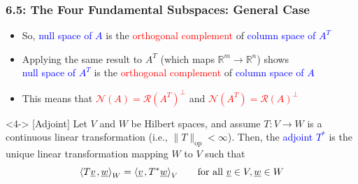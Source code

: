 \documentclass[10pt,english,aspectratio=169]{beamer}
\begin{document}
\begin{frame}
\frametitle{6.5: The Four Fundamental Subspaces: General Case}

\begin{itemize}
\setlength\itemsep{3mm}

\item<1-> So, \textcolor{blue}{null space of $A$} is the \textcolor{red}{orthogonal complement} of \textcolor{blue}{column space of $A^T$} 

\item<2-> Applying the same result to $A^T$ (which maps $\mathbb{R}^m \to \mathbb{R}^n$) shows \\[1.5mm] \hspace{2mm}
 \textcolor{blue}{null space of $A^T$} is the \textcolor{red}{orthogonal complement} of \textcolor{blue}{column space of $A$} 

\item<3-> This means that \textcolor{red}{$\mathcal{N}(A) = \mathcal{R}(A^T)^\perp$} and \textcolor{red}{$\mathcal{N}(A^T) = \mathcal{R}(A)^\perp$}
\end{itemize}

\begin{definition}<4-> [Adjoint]
Let $V$ and $W$ be Hilbert spaces, and assume $T \colon V \rightarrow W$ is a continuous linear transformation (i.e., $\| T \|_{\mathrm{op}} < \infty$).
Then, the \textcolor{blue}{adjoint $T^*$} is the unique linear transformation mapping $W$ to $V$ such that \vspace{-2mm}
\begin{equation*}
{\left\langle  T \underline{v}  \mskip2mu ,  \underline{w}  \right\rangle}_W
= {\left\langle  \underline{v}  \mskip2mu ,  T^* \underline{w}  \right\rangle}_V \quad\quad \text{for all }\underline{v} \in V, \underline{w} \in W
\end{equation*}

\vspace{-3mm}
\end{definition}


\end{frame}
\end{document}
